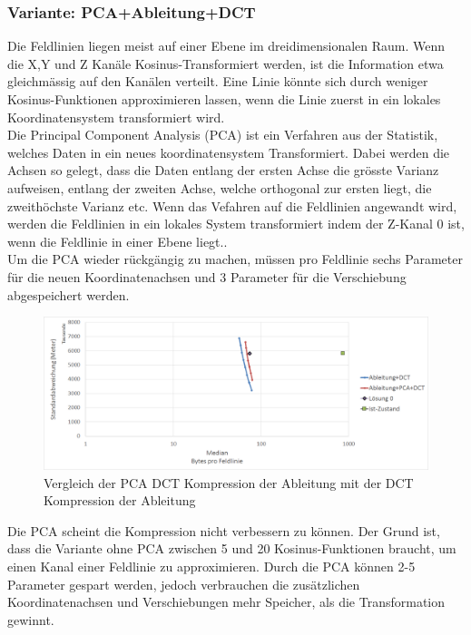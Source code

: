 \subsubsection{Variante: PCA+Ableitung+DCT}
Die Feldlinien liegen meist auf einer Ebene im dreidimensionalen Raum. Wenn die X,Y und Z Kanäle Kosinus-Transformiert werden, ist die Information etwa gleichmässig auf den Kanälen verteilt. Eine Linie könnte sich durch weniger Kosinus-Funktionen approximieren lassen, wenn die Linie zuerst in ein lokales Koordinatensystem transformiert wird.\\
Die Principal Component Analysis (PCA)\cite{abdi2010principal} ist ein Verfahren aus der Statistik, welches Daten in ein neues koordinatensystem Transformiert. Dabei werden die Achsen so gelegt, dass die Daten entlang der ersten Achse die grösste Varianz aufweisen, entlang der zweiten Achse, welche orthogonal zur ersten liegt, die zweithöchste Varianz etc. Wenn das Vefahren auf die Feldlinien angewandt wird, werden die Feldlinien in ein lokales System transformiert indem der Z-Kanal 0 ist, wenn die Feldlinie in einer Ebene liegt..\\
Um die PCA wieder rückgängig zu machen, müssen pro Feldlinie sechs Parameter für die neuen Koordinatenachsen und 3 Parameter für die Verschiebung abgespeichert werden.
\begin{figure}[!htbp]
	\center
	\includegraphics[width=1\textwidth,keepaspectratio]{./pictures/resultate/loesung1/loesung1-4/loesung1_4.png}
	\caption{Vergleich der PCA DCT Kompression der Ableitung mit der DCT Kompression der Ableitung}
	\label{resultate:loesung1:dct:pca}
\end{figure}
Die PCA scheint die Kompression nicht verbessern zu können. Der Grund ist, dass die Variante ohne PCA zwischen 5 und 20 Kosinus-Funktionen braucht, um einen Kanal einer Feldlinie zu approximieren. Durch die PCA können 2-5 Parameter gespart werden, jedoch verbrauchen die zusätzlichen Koordinatenachsen und Verschiebungen mehr Speicher, als die Transformation gewinnt.

